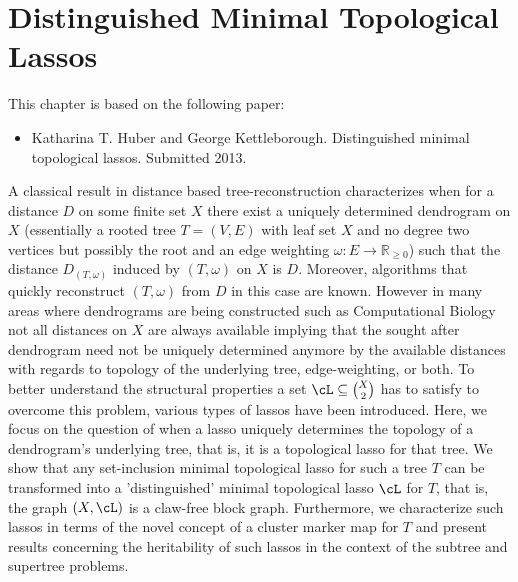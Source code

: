 \chapter{Distinguished Minimal Topological Lassos}
\label{cha:dist-minim-topl}

This chapter is based on the following paper:
\vspace{0.5em}

\noindent

\begin{itemize}
\item Katharina T. Huber and George Kettleborough. Distinguished minimal
  topological lassos.  Submitted 2013.
\end{itemize}



\newpage

A classical result in distance based tree-reconstruction characterizes when
for a distance $D$ on some finite set $X$ there exist a uniquely determined
dendrogram on $X$ (essentially a rooted tree $T=(V,E)$ with leaf set $X$ and
no degree two vertices but possibly the root and an edge weighting
$\omega:E\to \mathbb R_{\geq 0}$) such that the distance $D_{(T,\omega)}$
induced by $(T,\omega)$ on $X$ is $D$.  Moreover, algorithms that quickly
reconstruct $(T,\omega)$ from $D$ in this case are known.  However in many
areas where dendrograms are being constructed such as Computational Biology
not all distances on $X$ are always available implying that the sought after
dendrogram need not be uniquely determined anymore by the available distances
with regards to topology of the underlying tree, edge-weighting, or both.  To
better understand the structural properties a set $\cL\subseteq {X\choose 2}$
has to satisfy to overcome this problem,
various types of lassos have been introduced.  Here, we focus on the question
of when a lasso uniquely determines the topology of a dendrogram's underlying
tree, that is, it is a topological lasso for that tree.  We show that any
set-inclusion minimal topological lasso for such a tree $T$ can be transformed
into a 'distinguished' minimal topological lasso $\cL$ for $T$, that is, the
graph $(X,\cL)$ is a claw-free block graph. Furthermore, we characterize such
lassos in terms of the novel concept of a cluster marker map for $T$ and
present results concerning the heritability of such lassos in the context of
the subtree and supertree problems.

